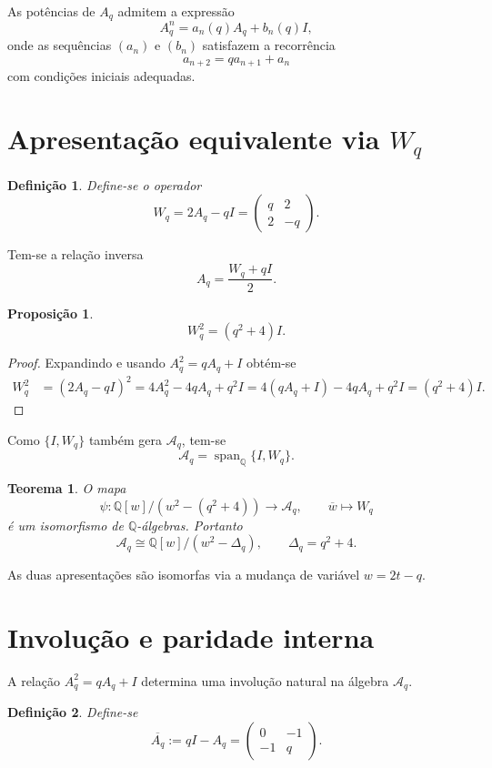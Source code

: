 \documentclass[11pt,a4paper]{article}
\newtheorem{definicao}{Definição}
\newtheorem{teorema}{Teorema}
\newtheorem{proposicao}{Proposição}
\begin{document}
As potências de \(A_q\) admitem a expressão
\[
A_q^n=a_n(q)A_q+b_n(q)I,
\]
onde as sequências \((a_n)\) e \((b_n)\) satisfazem a recorrência
\[
a_{n+2}=qa_{n+1}+a_n
\]
com condições iniciais adequadas.

\section{Apresentação equivalente via \(W_q\)}

\begin{definicao}
Define-se o operador
\[
W_q=2A_q-qI=\begin{pmatrix}q&2\\2&-q\end{pmatrix}.
\]
\end{definicao}

Tem-se a relação inversa
\[
A_q=\frac{W_q+qI}{2}.
\]

\begin{proposicao}
\[
W_q^2=(q^2+4)I.
\]
\end{proposicao}

\begin{proof}
Expandindo e usando \(A_q^2=qA_q+I\) obtém-se
\begin{align*}
W_q^2
&=(2A_q-qI)^2
=4A_q^2-4qA_q+q^2I
=4(qA_q+I)-4qA_q+q^2I
=(q^2+4)I.
\end{align*}
\end{proof}

Como \(\{I,W_q\}\) também gera \(\mathcal{A}_q\), tem-se
\[
\mathcal{A}_q=\operatorname{span}_{\mathbb{Q}}\{I,W_q\}.
\]

\begin{teorema}
O mapa
\[
\psi:\mathbb{Q}[w]/(w^2-(q^2+4))\longrightarrow\mathcal{A}_q,
\qquad
\overline{w}\longmapsto W_q
\]
é um isomorfismo de \(\mathbb{Q}\)-álgebras. Portanto
\[
\boxed{\mathcal{A}_q\cong\mathbb{Q}[w]/(w^2-\Delta_q)},
\qquad
\Delta_q=q^2+4.
\]
\end{teorema}

As duas apresentações são isomorfas via a mudança de variável \(w=2t-q\).

\section{Involução e paridade interna}

A relação \(A_q^2=qA_q+I\) determina uma involução natural na álgebra \(\mathcal{A}_q\).

\begin{definicao}
Define-se
\[
\overline{A_q}:=qI-A_q=\begin{pmatrix}0&-1\\-1&q\end{pmatrix}.
\]
\end{definicao}
\end{document}
